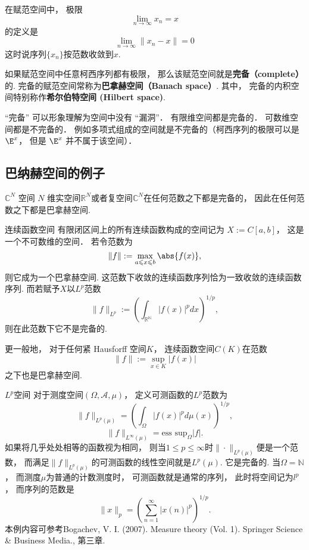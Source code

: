 
在赋范空间中， 极限
\begin{equation}
\lim_{n\to\infty} x_n = x
\end{equation}
的定义是
\begin{equation}
\lim_{n\to\infty} \|{x_n - x}\|= 0
\end{equation}
这时说序列$\{x_n\}$按范数收敛到$x$.

如果赋范空间中任意柯西序列都有极限， 那么该赋范空间就是\textbf{完备（complete）}的. 完备的赋范空间常称为\textbf{巴拿赫空间（Banach space）}. 其中， 完备的内积空间特别称作\textbf{希尔伯特空间 (Hilbert space)}.

“完备” 可以形象理解为空间中没有 “漏洞”． 有限维空间都是完备的． 可数维空间都是不完备的． 例如多项式组成的空间就是不完备的（柯西序列的极限可以是 $\E^x$， 但是 $\E^x$ 并不属于该空间）．

\subsection{巴纳赫空间的例子}
\begin{example}{$\mathbb C^N$ 空间}
$N$ 维实空间$\mathbb R^N$或者复空间$\mathbb C^N$在任何范数之下都是完备的， 因此在任何范数之下都是巴拿赫空间.
\end{example}

\begin{example}{连续函数空间}
有限闭区间上的所有连续函数构成的空间记为 $X := C[a, b]$， 这是一个不可数维的空间． 若令范数为
$$
\|{f}\|:= \max_{a \leqslant x \leqslant b} \abs{f(x)},
$$
则它成为一个巴拿赫空间. 这范数下收敛的连续函数序列恰为一致收敛的连续函数序列. 而若赋予$X$以$L^p$范数
$$
\|f\|_{L^p}:=\left(\int_{\mathbb{R^N}}|f(x)|^pdx\right)^{1/p},
$$
则在此范数下它不是完备的.

更一般地， 对于任何紧 Hausforff 空间$K$， 连续函数空间$C(K)$在范数
$$
\|f\|:=\sup_{x\in K}|f(x)|
$$
之下也是巴拿赫空间.
\end{example}

\begin{example}{$L^p$空间}
对于测度空间$(\Omega,\mathcal{A},\mu)$， 定义可测函数的$L^p$范数为
$$
\|f\|_{L^p(\mu)}=\left(\int_\Omega |f(x)|^pd\mu(x)\right)^{1/p},
$$
$$
\|f\|_{L^\infty(\mu)}=\text{ess sup}_{\Omega}|f|.
$$
如果将几乎处处相等的函数视为相同， 则当$1\leq p\leq\infty$时$\|\cdot\|_{L^p(\mu)}$便是一个范数， 而满足$\|f\|_{L^p(\mu)}$的可测函数的线性空间就是$L^p(\mu)$. 它是完备的. 当$\Omega=\mathbb{N}$， 而测度$\mu$为普通的计数测度时， 可测函数就是通常的序列， 此时将空间记为$l^p$， 而序列的范数是
$$
\|x\|_p=\left(\sum_{n=1}^\infty|x(n)|^p\right)^{1/p}.
$$
本例内容可参考Bogachev, V. I. (2007). Measure theory (Vol. 1). Springer Science \& Business Media., 第三章.
\end{example}

